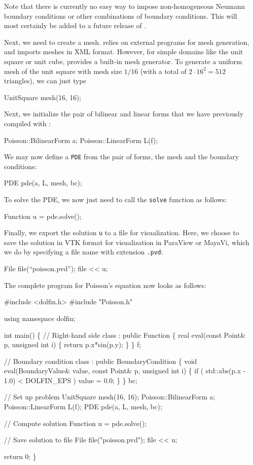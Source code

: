 Note that there is currently no easy way to impose non-homogeneous
Neumann boundary conditions or other combinations of boundary
conditions. This will most certainly be added to a future release of
\dolfin{}.

Next, we need to create a mesh. \dolfin{} relies on
external programs for mesh generation, and imports meshes in \dolfin{}
XML format. However, for simple domains like the unit square or unit
cube, \dolfin{} provides a built-in mesh generator. To generate a
uniform mesh of the unit square with mesh size $1/16$ (with a total of
$2\cdot 16^2 = 512$ triangles), we can just type
\begin{code}
  UnitSquare mesh(16, 16);
\end{code}

Next, we initialize the pair of bilinear and linear forms that we have
previously compiled with \ffc{}:
\begin{code}
  Poisson::BilinearForm a;
  Poisson::LinearForm L(f);
\end{code}
We may now define a \texttt{PDE} from the pair of forms, the mesh and
the boundary conditions:
\begin{code}
  PDE pde(a, L, mesh, bc);
\end{code}
To solve the PDE, we now just need to call the \texttt{solve} function
as follows:
\begin{code}
  Function u = pde.solve();
\end{code}

Finally, we export the solution \texttt{u} to a file for
visualization. Here, we choose to save the solution in VTK format for
visualization in ParaView or MayaVi, which we do by specifying a file
name with extension \texttt{.pvd}:
\begin{code}
  File file(``poisson.pvd'');
  file << u;
\end{code}

The complete program for Poisson's equation now looks as follows:
\small
\begin{code}
  #include <dolfin.h>
  #include "Poisson.h"
  
  using namespace dolfin;

  int main()
  \{
    // Right-hand side
    class : public Function
    \{
      real eval(const Point& p, unsigned int i)
      \{
        return p.x*sin(p.y);
      \}
    \} f;
  
    // Boundary condition
    class : public BoundaryCondition
    \{
      void eval(BoundaryValue& value, const Point& p, unsigned int i)
      \{
        if ( std::abs(p.x - 1.0) < DOLFIN_EPS )
          value = 0.0;
      \}
    \} bc;
  
    // Set up problem
    UnitSquare mesh(16, 16);
    Poisson::BilinearForm a;
    Poisson::LinearForm L(f);
    PDE pde(a, L, mesh, bc);

    // Compute solution
    Function u = pde.solve();

    // Save solution to file
    File file("poisson.pvd");
    file << u;

    return 0;
  \}
\end{code}
\normalsize

